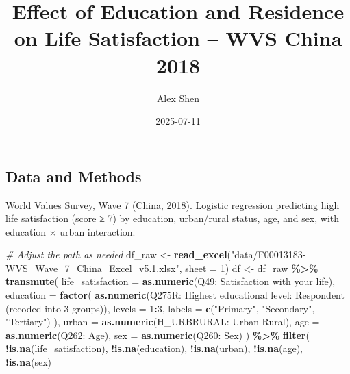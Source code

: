 \documentclass[
]{article}
\title{Effect of Education and Residence on Life Satisfaction -- WVS
China 2018}
\author{Alex Shen}
\date{2025-07-11}
\newenvironment{Shaded}{\begin{snugshade}}{\end{snugshade}}
\newcommand{\AttributeTok}[1]{\textcolor[rgb]{0.13,0.29,0.53}{#1}}
\newcommand{\CommentTok}[1]{\textcolor[rgb]{0.56,0.35,0.01}{\textit{#1}}}
\newcommand{\DecValTok}[1]{\textcolor[rgb]{0.00,0.00,0.81}{#1}}
\newcommand{\FunctionTok}[1]{\textcolor[rgb]{0.13,0.29,0.53}{\textbf{#1}}}
\newcommand{\NormalTok}[1]{#1}
\newcommand{\OtherTok}[1]{\textcolor[rgb]{0.56,0.35,0.01}{#1}}
\newcommand{\SpecialCharTok}[1]{\textcolor[rgb]{0.81,0.36,0.00}{\textbf{#1}}}
\newcommand{\StringTok}[1]{\textcolor[rgb]{0.31,0.60,0.02}{#1}}
\begin{document}
\maketitle

\subsection{Data and Methods}\label{data-and-methods}

World Values Survey, Wave 7 (China, 2018). Logistic regression
predicting high life satisfaction (score ≥ 7) by education, urban/rural
status, age, and sex, with education × urban interaction.

\begin{Shaded}
\begin{Highlighting}[]
\CommentTok{\# Adjust the path as needed}
\NormalTok{df\_raw }\OtherTok{\textless{}{-}} \FunctionTok{read\_excel}\NormalTok{(}\StringTok{"data/F00013183{-}WVS\_Wave\_7\_China\_Excel\_v5.1.xlsx"}\NormalTok{, }\AttributeTok{sheet =} \DecValTok{1}\NormalTok{)}
\NormalTok{df }\OtherTok{\textless{}{-}}\NormalTok{ df\_raw }\SpecialCharTok{\%\textgreater{}\%}
  \FunctionTok{transmute}\NormalTok{(}
    \AttributeTok{life\_satisfaction =} \FunctionTok{as.numeric}\NormalTok{(}\StringTok{\textasciigrave{}}\AttributeTok{Q49: Satisfaction with your life}\StringTok{\textasciigrave{}}\NormalTok{),}
    \AttributeTok{education =} \FunctionTok{factor}\NormalTok{(}
      \FunctionTok{as.numeric}\NormalTok{(}\StringTok{\textasciigrave{}}\AttributeTok{Q275R: Highest educational level: Respondent (recoded into 3 groups)}\StringTok{\textasciigrave{}}\NormalTok{),}
      \AttributeTok{levels =} \DecValTok{1}\SpecialCharTok{:}\DecValTok{3}\NormalTok{,}
      \AttributeTok{labels =} \FunctionTok{c}\NormalTok{(}\StringTok{"Primary"}\NormalTok{, }\StringTok{"Secondary"}\NormalTok{, }\StringTok{"Tertiary"}\NormalTok{)}
\NormalTok{    ),}
    \AttributeTok{urban =} \FunctionTok{as.numeric}\NormalTok{(}\StringTok{\textasciigrave{}}\AttributeTok{H\_URBRURAL: Urban{-}Rural}\StringTok{\textasciigrave{}}\NormalTok{),}
    \AttributeTok{age =} \FunctionTok{as.numeric}\NormalTok{(}\StringTok{\textasciigrave{}}\AttributeTok{Q262: Age}\StringTok{\textasciigrave{}}\NormalTok{),}
    \AttributeTok{sex =} \FunctionTok{as.numeric}\NormalTok{(}\StringTok{\textasciigrave{}}\AttributeTok{Q260: Sex}\StringTok{\textasciigrave{}}\NormalTok{)}
\NormalTok{  ) }\SpecialCharTok{\%\textgreater{}\%}
  \FunctionTok{filter}\NormalTok{(}
    \SpecialCharTok{!}\FunctionTok{is.na}\NormalTok{(life\_satisfaction), }\SpecialCharTok{!}\FunctionTok{is.na}\NormalTok{(education), }\SpecialCharTok{!}\FunctionTok{is.na}\NormalTok{(urban), }\SpecialCharTok{!}\FunctionTok{is.na}\NormalTok{(age), }\SpecialCharTok{!}\FunctionTok{is.na}\NormalTok{(sex)}

\end{Highlighting}
\end{Shaded}
\end{document}
